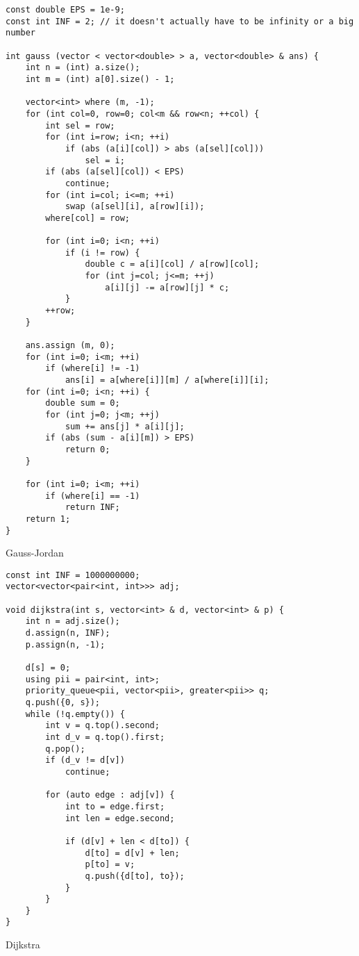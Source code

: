 \documentclass{article}
\begin{document}
\begin{lstlisting}
const double EPS = 1e-9;
const int INF = 2; // it doesn't actually have to be infinity or a big number

int gauss (vector < vector<double> > a, vector<double> & ans) {
    int n = (int) a.size();
    int m = (int) a[0].size() - 1;

    vector<int> where (m, -1);
    for (int col=0, row=0; col<m && row<n; ++col) {
        int sel = row;
        for (int i=row; i<n; ++i)
            if (abs (a[i][col]) > abs (a[sel][col]))
                sel = i;
        if (abs (a[sel][col]) < EPS)
            continue;
        for (int i=col; i<=m; ++i)
            swap (a[sel][i], a[row][i]);
        where[col] = row;

        for (int i=0; i<n; ++i)
            if (i != row) {
                double c = a[i][col] / a[row][col];
                for (int j=col; j<=m; ++j)
                    a[i][j] -= a[row][j] * c;
            }
        ++row;
    }

    ans.assign (m, 0);
    for (int i=0; i<m; ++i)
        if (where[i] != -1)
            ans[i] = a[where[i]][m] / a[where[i]][i];
    for (int i=0; i<n; ++i) {
        double sum = 0;
        for (int j=0; j<m; ++j)
            sum += ans[j] * a[i][j];
        if (abs (sum - a[i][m]) > EPS)
            return 0;
    }

    for (int i=0; i<m; ++i)
        if (where[i] == -1)
            return INF;
    return 1;
}
\end{lstlisting}

Gauss-Jordan

\begin{lstlisting}
const int INF = 1000000000;
vector<vector<pair<int, int>>> adj;

void dijkstra(int s, vector<int> & d, vector<int> & p) {
    int n = adj.size();
    d.assign(n, INF);
    p.assign(n, -1);

    d[s] = 0;
    using pii = pair<int, int>;
    priority_queue<pii, vector<pii>, greater<pii>> q;
    q.push({0, s});
    while (!q.empty()) {
        int v = q.top().second;
        int d_v = q.top().first;
        q.pop();
        if (d_v != d[v])
            continue;

        for (auto edge : adj[v]) {
            int to = edge.first;
            int len = edge.second;

            if (d[v] + len < d[to]) {
                d[to] = d[v] + len;
                p[to] = v;
                q.push({d[to], to});
            }
        }
    }
}
\end{lstlisting}
Dijkstra
\end{document}
